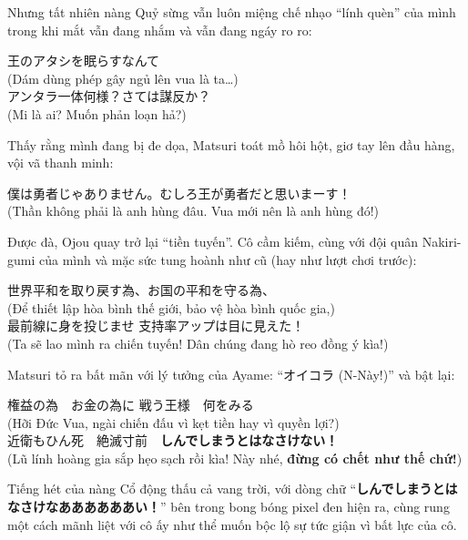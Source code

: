 \documentclass[../main.tex]{subfiles}
\begin{document}
Nhưng tất nhiên nàng Quỷ sừng vẫn luôn miệng chế nhạo ``lính quèn'' của mình trong khi mắt vẫn đang nhắm và vẫn đang ngáy ro ro:
\begin{center}
  王のアタシを眠らすなんて \\ (Dám dùng phép gây ngủ lên vua là ta\dots ) \\
  アンタラ一体何様？さては謀反か？ \\ (Mi là ai? Muốn phản loạn hả?)
\end{center}

Thấy rằng mình đang bị đe dọa, Matsuri toát mồ hôi hột, giơ tay lên đầu hàng, vội vã thanh minh:
\begin{center}
  僕は勇者じゃありません。むしろ王が勇者だと思いまーす！ \\ (Thần không phải là anh hùng đâu. Vua mới nên là anh hùng đó!)
\end{center}


Được đà, Ojou quay trở lại ``tiền tuyến''. Cô cầm kiếm, cùng với đội quân Nakiri-gumi của mình và mặc sức tung hoành như cũ (hay như lượt chơi trước):
\begin{center}
  世界平和を取り戻す為、お国の平和を守る為、 \\ (Để thiết lập hòa bình thế giới, bảo vệ hòa bình quốc gia,) \\
  最前線に身を投じませ   支持率アップは目に見えた！ \\ (Ta sẽ lao mình ra chiến tuyến! Dân chúng đang hò reo đồng ý kìa!)
\end{center}



Matsuri tỏ ra bất mãn với lý tưởng của Ayame: ``オイコラ (N-Này!)'' và bật lại:
\begin{center}
  権益の為　お金の為に  戦う王様　何をみる \\ (Hỡi Đức Vua, ngài chiến đấu vì kẹt tiền hay vì quyền lợi?) \\
  近衛もひん死　絶滅寸前　\textbf{しんでしまうとはなさけない！} \\ (Lũ lính hoàng gia sắp hẹo sạch rồi kìa! Này nhé, \textbf{đừng có chết như thế chứ!})
\end{center}

Tiếng hét của nàng Cổ động thấu cả vang trời, với dòng chữ ``\textbf{しんでしまうとはなさけなああああああい！}'' bên trong bong bóng pixel đen hiện ra, cùng rung một cách mãnh liệt với cô ấy như thể muốn bộc lộ sự tức giận vì bất lực của cô.
\end{document}
